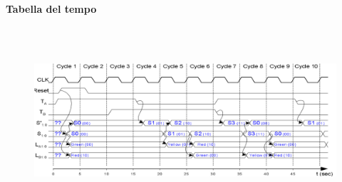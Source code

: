 \documentclass{report}
\newcommand{\subsubsubsection}[1]{\paragraph{#1}\mbox{}\\}
\begin{document}
            \subsubsubsection{Tabella del tempo}
                \begin{center}
                    \begin{figure}[H]
                        \includegraphics[width = \textwidth, height = 5cm]{fsmt.png}
                    \end{figure}
                \end{center}

            



                



    

     

         
        
\end{document}
